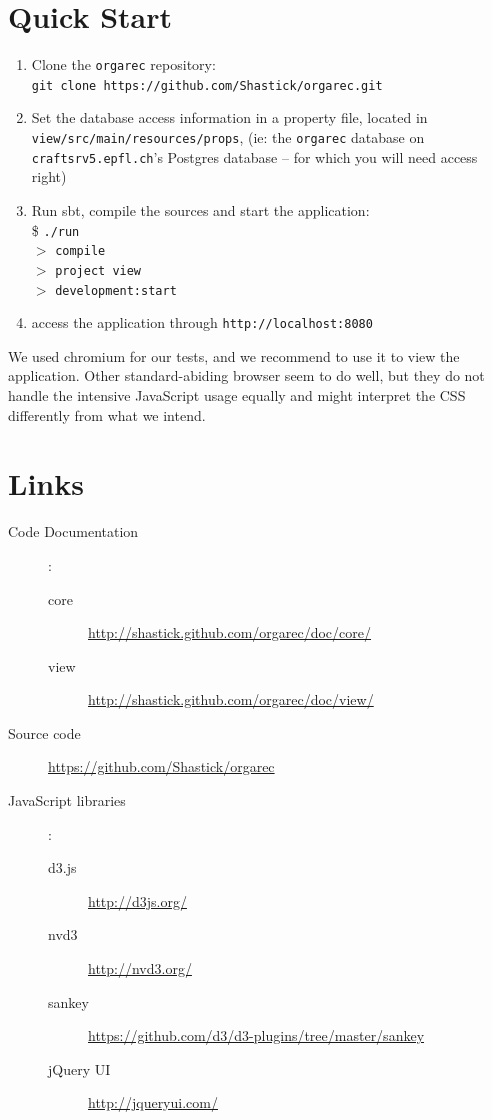 \section{Quick Start}
\begin{enumerate}
\item Clone the \verb|orgarec| repository: \\\verb|git clone https://github.com/Shastick/orgarec.git|
\item Set the database access information in a property file, located in \\ \verb|view/src/main/resources/props|, (ie: the \verb|orgarec| database on \verb|craftsrv5.epfl.ch|'s Postgres database -- for which you will need access right)
\item Run sbt, compile the sources and start the application: \\
\$ \verb|./run|  \\
$>$ \verb|compile| \\
$>$ \verb|project view| \\
$>$ \verb|development:start|
\item access the application through \verb|http://localhost:8080|
\end{enumerate}
We used chromium for our tests, and we recommend to use it to view the application. Other standard-abiding browser seem to do well, but they do not handle the intensive JavaScript usage equally and might interpret the CSS differently from what we intend.
\section{Links}
\begin{description}
\item[Code Documentation] :
\begin{description}
 \item[core] \url{http://shastick.github.com/orgarec/doc/core/}
 \item[view] \url{http://shastick.github.com/orgarec/doc/view/}
\end{description}
\item[Source code] \url{https://github.com/Shastick/orgarec}
\item[JavaScript libraries] :

         \begin{description}
	\item[d3.js] \url{http://d3js.org/}
	\item[nvd3] \url{http://nvd3.org/}
	\item[sankey] \url{https://github.com/d3/d3-plugins/tree/master/sankey}
	\item[jQuery UI] \url{http://jqueryui.com/}
	\end{description}
	
\end{description}


